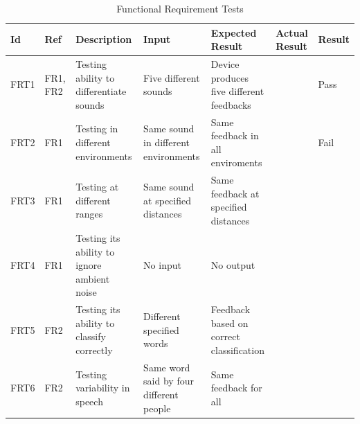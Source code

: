 \documentclass[12pt, titlepage]{article}
\begin{document}
\begin{longtable}{|p{1.4cm}|p{1cm}|p{3cm}|p{1.5cm}|p{2.5cm}|p{2cm}|p{1.2cm}|}
  \caption{Functional Requirement Tests}
  \label{functionalRequirementTests}
  \endfirsthead
  \endhead
  \hline
  \textbf{Id} & \textbf{Ref} & \textbf{Description}                                                         & \textbf{Input}                                    & \textbf{Expected Result}                                    & \textbf{Actual Result} & \textbf{Result}                                    \\ \hline
  FRT1        & FR1, FR2     & Testing ability to differentiate sounds                                     & Five different sounds                             & Device produces five different feedbacks                    &                        & {\color[HTML]{32CB00} Pass}                        \\ \hline
  FRT2        & FR1          & Testing in different environments                                            & Same sound in different environments              & Same feedback in all enviroments                            &                        & {\color[HTML]{FE0000} Fail}                        \\ \hline
  FRT3        & FR1          & Testing at different ranges                                                  & Same sound at specified distances                 & Same feedback at specified distances                        &                        & \cellcolor[HTML]{FFFFFF}{\color[HTML]{F8A102} TBD} \\ \hline
  FRT4        & FR1          & Testing its ability to ignore ambient noise                                  & No input                                          & No output                                                   &                        &                                                    \\ \hline
  FRT5        & FR2          & Testing its ability to classify correctly                                    & Different specified words                         & Feedback based on correct classification                    &                        &                                                    \\ \hline
  FRT6        & FR2          & Testing variability in speech                                                & Same word said by four different people           & Same feedback for all                                       &                        &                                                    \\ \hline

\end{longtable}
\end{document}
